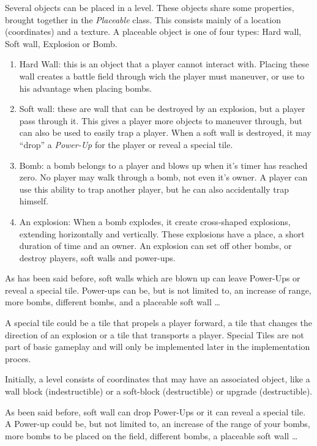           Several objects can be placed in a level. These objects share some properties, brought together in the \emph{Placeable} class. This consists mainly of a location (coordinates) and a texture. A placeable object is one of four types: Hard wall, Soft wall, Explosion or Bomb.\\
            \begin{enumerate}
              \item Hard Wall: this is an object that a player cannot interact with. Placing these wall creates a battle field through wich the player must maneuver, or use to his advantage when placing bombs.
              \item Soft wall: these are wall that can be destroyed by an explosion, but a player pass through it. This gives a player more objects to maneuver through, but can also be used to easily trap a player. When a soft wall is destroyed, it may ``drop'' a \emph{Power-Up} for the player or reveal a special tile.
              \item Bomb: a bomb belongs to a player and blows up when it's timer has reached zero. No player may walk through a bomb, not even it's owner. A player can use this ability to trap another player, but he can also accidentally trap himself.
              \item An explosion: When a bomb explodes, it create cross-shaped explosions, extending horizontally and vertically. These explosions have a place, a short duration of time and an owner. An explosion can set off other bombs, or destroy players, soft walls and power-ups.
            \end{enumerate}

          As has been said before, soft walls which are blown up can leave Power-Ups or reveal a special tile. Power-ups can be, but is not limited to, an increase of range, more bombs, different bombs, and a placeable soft wall \ldots

          A special tile could be a tile that propels a player forward, a tile that changes the direction of an explosion or a tile that transports a player. Special Tiles are not part of basic gameplay and will only be implemented later in the implementation proces.

      Initially, a level consists of coordinates that may have an associated object, like a wall block (indestructible) or a soft-block (destructible) or upgrade (destructible).

          As been said before, soft wall can drop Power-Ups or it can reveal a special tile. A Power-up could be, but not limited to, an increase of the range of your bombs, more bombs to be placed on the field, different bombs, a placeable soft wall \ldots


